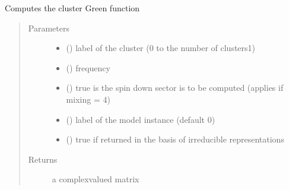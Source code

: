 \documentclass[letterpaper,10pt,english]{sphinxmanual}
\begin{document}

\begin{fulllineitems}
\label{\detokenize{functions:pyqcm.cluster_Green_function}}
\sphinxAtStartPar
Computes the cluster Green function
\begin{quote}\begin{description}
\item[{Parameters}] \leavevmode\begin{itemize}
\item {} 
\sphinxAtStartPar
{} () \textendash{} label of the cluster (0 to the number of clusters\sphinxhyphen{}1)

\item {} 
\sphinxAtStartPar
{} () \textendash{} frequency

\item {} 
\sphinxAtStartPar
{} () \textendash{} true is the spin down sector is to be computed (applies if mixing =       4)

\item {} 
\sphinxAtStartPar
{} () \textendash{} label of the model instance (default 0)

\item {} 
\sphinxAtStartPar
{} () \textendash{} true if returned in the basis of irreducible representations

\end{itemize}

\item[{Returns}] \leavevmode
\sphinxAtStartPar
a complex\sphinxhyphen{}valued matrix

\end{description}\end{quote}

\end{fulllineitems}
\end{document}
